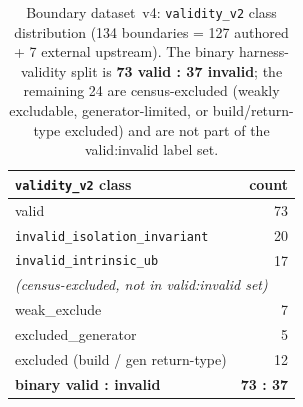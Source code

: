\begin{table}[t]
  \centering
  \caption{Boundary dataset~v4: \texttt{validity\_v2} class distribution
    (134 boundaries = 127 authored + 7 external upstream). The binary
    harness-validity split is \textbf{73 valid : 37 invalid}; the remaining
    24 are census-excluded (weakly excludable, generator-limited, or
    build/return-type excluded) and are not part of the valid:invalid label set.}
  \label{tab:dataset-v4}
  \begin{tabular}{lr}
    \toprule
    \texttt{validity\_v2} class            & count \\
    \midrule
    valid                                  & 73 \\
    \texttt{invalid\_isolation\_invariant} & 20 \\
    \texttt{invalid\_intrinsic\_ub}        & 17 \\
    \midrule
    \multicolumn{2}{l}{\emph{(census-excluded, not in valid:invalid set)}} \\
    weak\_exclude                          & 7 \\
    excluded\_generator                    & 5 \\
    excluded (build / gen return-type)     & 12 \\
    \midrule
    \textbf{binary valid : invalid}        & \textbf{73 : 37} \\
    \bottomrule
  \end{tabular}
\end{table}


